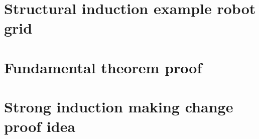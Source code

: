 
\section*{Structural induction example robot grid}

\vfill
\section*{Fundamental theorem proof}

\vfill
\section*{Strong induction making change proof idea}

\vfill
